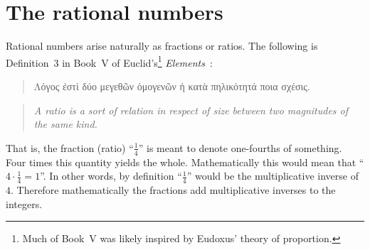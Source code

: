 \documentclass[../main.tex]{subfiles}
\begin{document}
\section{The rational numbers}\label{sec:the_natural_numbers_integers_and_rational_numbers:the_rational_numbers}
Rational numbers arise naturally as fractions or ratios. The following is Definition~3 in Book~V of Euclid's\footnote{Much of Book~V was likely inspired by Eudoxus' theory of proportion.} \textit{Elements}~\cite{Heath1926}:
\begin{quote}
    \textgreek{Λόγος ἐστὶ δύο μεγεθῶν ὁμογενῶν ἡ κατὰ πηλικότητά ποια σχέσις.}
\end{quote}
\begin{quote}
    \textit{A ratio is a sort of relation in respect of size between two magnitudes of the same kind.}
\end{quote}
That is, the fraction (ratio) ``$\frac{1}{4}$'' is meant to denote one-fourths of something. Four times this quantity yields the whole. Mathematically this would mean that ``$4\cdot\frac{1}{4}=1$''. In other words, by definition ``$\frac{1}{4}$'' would be the multiplicative inverse of $4$. Therefore mathematically the fractions add multiplicative inverses to the integers.
\end{document}
